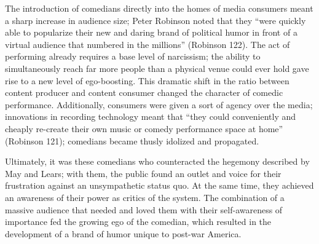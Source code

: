 The introduction of comedians directly into the homes of media consumers meant a
sharp increase in audience size; Peter Robinson noted that they ``were quickly
able to popularize their new and daring brand of political humor in front of a
virtual audience that numbered in the millions'' (Robinson 122). The act of
performing already requires a base level of narcissism; the ability to
simultaneously reach far more people than a physical venue could ever hold gave
rise to a new level of ego-boosting. This dramatic shift in the ratio between
content producer and content consumer changed the character of comedic
performance. Additionally, consumers were given a sort of agency over the media;
innovations in recording technology meant that ``they could conveniently and
cheaply re-create their own music or comedy performance space at home'' (Robinson
121); comedians became thusly idolized and propagated.

Ultimately, it was these comedians who counteracted the hegemony described by
May and Lears; with them, the public found an outlet and voice for their
frustration against an unsympathetic status quo. At the same time, they achieved
an awareness of their power as critics of the system. The combination of a
massive audience that needed and loved them with their self-awareness of
importance fed the growing ego of the comedian, which resulted in the
development of a brand of humor unique to post-war America.

